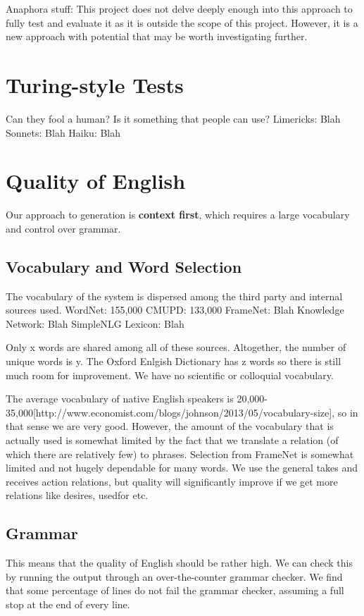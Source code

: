 Anaphora stuff:
This project does not delve deeply enough into this approach to fully test and evaluate it as it is outside the scope of this project. However, it is a new approach with potential that may be worth investigating further. 



\section{Turing-style Tests}
Can they fool a human?
Is it something that people can use?
Limericks: Blah
Sonnets: Blah
Haiku: Blah


\section{Quality of English}
Our approach to generation is \textbf{context first}, which requires a large vocabulary and control over grammar.
\subsection{Vocabulary and Word Selection}
The vocabulary of the system is dispersed among the third party and internal sources used.
WordNet: 155,000
CMUPD: 133,000
FrameNet: Blah
Knowledge Network: Blah
SimpleNLG Lexicon: Blah

Only x words are shared among all of these sources. Altogether, the number of unique words is y. The Oxford Enlgish Dictionary has z words so there is still much room for improvement. We have no scientific or colloquial vocabulary. 

The average vocabulary of native English speakers is 20,000-35,000[http://www.economist.com/blogs/johnson/2013/05/vocabulary-size], so in that sense we are very good. However, the amount of the vocabulary that is actually used is somewhat limited by the fact that we translate a relation (of which there are relatively few) to phrases. Selection from FrameNet is somewhat limited and not hugely dependable for many words. We use the general takes and receives action relations, but quality will significantly improve if we get more relations like desires, usedfor etc.

\subsection{Grammar}
This means that the quality of English should be rather high. We can check this by running the output through an over-the-counter grammar checker. We find that some percentage of lines do not fail the grammar checker, assuming a full stop at the end of every line.

